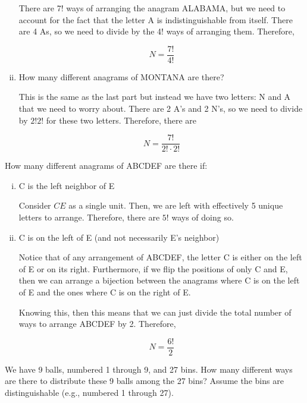 \documentclass[11pt]{article}
\begin{document}
\begin{Parts}
\begin{enumerate}[i.]
    \begin{solution}
      There are 7! ways of arranging the anagram ALABAMA, but we need to account for the fact that the letter A is indistinguishable from itself. There are 4 As, so we need to divide by the 4! ways of arranging them. Therefore, 

      \[ N = \frac{7!}{4!}\]
    \end{solution}
    \item How many different anagrams of MONTANA are there?
    
    \begin{solution}
      This is the same as the last part but instead we have two letters: N and A that we need to worry about. There are 2 A's and 2 N's, so we need to divide by $2!2!$ for these two letters. Therefore, there are 

      \[ N = \frac{7!}{2! \cdot 2!}\]
    \end{solution}
  \end{enumerate}
 
\Part How many different anagrams of ABCDEF are there if:
\begin{enumerate}[i.]
  \item C is the left neighbor of E
  
  \begin{solution}
    Consider $CE$ as a single unit. Then, we are left with effectively 5 unique letters to arrange. Therefore, there are $5!$ ways of doing so. 
  \end{solution}
  \item C is on the left of E (and not necessarily E's neighbor)
  
  \begin{solution}
    Notice that of any arrangement of ABCDEF, the letter C is either on the left of E or on its right. Furthermore, if we flip the positions of only C and E, then we can arrange a bijection between the anagrams where C is on the left of E and the ones where C is on the right of E. 

    Knowing this, then this means that we can just divide the total number of ways to arrange ABCDEF by 2. Therefore, 

    \[ N = \frac{6!}{2}\]
  \end{solution}
\end{enumerate}

\Part We have 9 balls, numbered 1 through 9, and 27 bins.
  How many different ways are there to distribute these 9 balls among
  the 27 bins? Assume the bins are distinguishable (e.g., numbered 1
  through 27).


\end{Parts}
\end{document}
